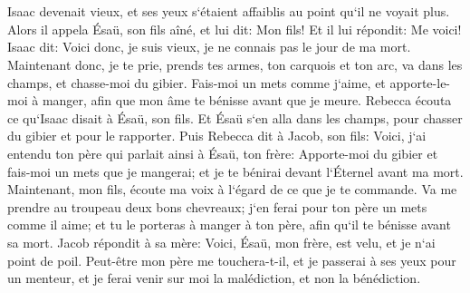 \chapter{}

\verse Isaac devenait vieux, et ses yeux s`étaient affaiblis au point qu`il ne voyait plus. Alors il appela Ésaü, son fils aîné, et lui dit: Mon fils! Et il lui répondit: Me voici! 
\verse Isaac dit: Voici donc, je suis vieux, je ne connais pas le jour de ma mort. 
\verse Maintenant donc, je te prie, prends tes armes, ton carquois et ton arc, va dans les champs, et chasse-moi du gibier. 
\verse Fais-moi un mets comme j`aime, et apporte-le-moi à manger, afin que mon âme te bénisse avant que je meure. 
\verse Rebecca écouta ce qu`Isaac disait à Ésaü, son fils. Et Ésaü s`en alla dans les champs, pour chasser du gibier et pour le rapporter. 
\verse Puis Rebecca dit à Jacob, son fils: Voici, j`ai entendu ton père qui parlait ainsi à Ésaü, ton frère: 
\verse Apporte-moi du gibier et fais-moi un mets que je mangerai; et je te bénirai devant l`Éternel avant ma mort. 
\verse Maintenant, mon fils, écoute ma voix à l`égard de ce que je te commande. 
\verse Va me prendre au troupeau deux bons chevreaux; j`en ferai pour ton père un mets comme il aime; 
\verse et tu le porteras à manger à ton père, afin qu`il te bénisse avant sa mort. 
\verse Jacob répondit à sa mère: Voici, Ésaü, mon frère, est velu, et je n`ai point de poil. 
\verse Peut-être mon père me touchera-t-il, et je passerai à ses yeux pour un menteur, et je ferai venir sur moi la malédiction, et non la bénédiction. 
